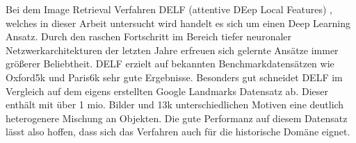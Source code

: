 Bei dem Image Retrieval Verfahren DELF (attentive DEep Local Features) \cite{delf}, welches in dieser Arbeit untersucht wird handelt es sich um einen Deep Learning Ansatz. Durch den raschen Fortschritt im Bereich tiefer neuronaler Netzwerkarchitekturen der letzten Jahre erfreuen sich gelernte Ansätze immer größerer Beliebtheit. DELF erzielt auf bekannten Benchmarkdatensätzen wie Oxford5k \cite{oxford5k} und Paris6k \cite{paris6k} sehr gute Ergebnisse. Besonders gut schneidet DELF im Vergleich auf dem eigens erstellten Google Landmarks Datensatz \cite{landmarks} ab. Dieser enthält mit über 1 mio. Bilder und 13k unterschiedlichen Motiven eine deutlich heterogenere Mischung an Objekten. Die gute Performanz auf diesem Datensatz lässt also hoffen, dass sich das Verfahren auch für die historische Domäne eignet.


